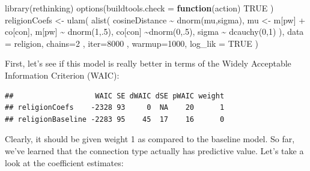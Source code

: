 \documentclass[
  12pt,
]{book}
\newenvironment{Shaded}{\begin{snugshade}}{\end{snugshade}}
\newcommand{\AttributeTok}[1]{\textcolor[rgb]{0.77,0.63,0.00}{#1}}
\newcommand{\ConstantTok}[1]{\textcolor[rgb]{0.00,0.00,0.00}{#1}}
\newcommand{\ControlFlowTok}[1]{\textcolor[rgb]{0.13,0.29,0.53}{\textbf{#1}}}
\newcommand{\DecValTok}[1]{\textcolor[rgb]{0.00,0.00,0.81}{#1}}
\newcommand{\FunctionTok}[1]{\textcolor[rgb]{0.00,0.00,0.00}{#1}}
\newcommand{\NormalTok}[1]{#1}
\newcommand{\OtherTok}[1]{\textcolor[rgb]{0.56,0.35,0.01}{#1}}
\newcommand{\SpecialCharTok}[1]{\textcolor[rgb]{0.00,0.00,0.00}{#1}}
\begin{document}
\vspace{1mm}
\footnotesize

\begin{Shaded}
\begin{Highlighting}[]
\FunctionTok{library}\NormalTok{(rethinking)}
\FunctionTok{options}\NormalTok{(}\AttributeTok{buildtools.check =} \ControlFlowTok{function}\NormalTok{(action) }\ConstantTok{TRUE}\NormalTok{ )}
\NormalTok{religionCoefs }\OtherTok{\textless{}{-}} \FunctionTok{ulam}\NormalTok{(}
  \FunctionTok{alist}\NormalTok{(}
\NormalTok{    cosineDistance }\SpecialCharTok{\textasciitilde{}} \FunctionTok{dnorm}\NormalTok{(mu,sigma),}
\NormalTok{    mu }\OtherTok{\textless{}{-}}\NormalTok{ m[pw] }\SpecialCharTok{+}\NormalTok{ co[con],}
\NormalTok{    m[pw] }\SpecialCharTok{\textasciitilde{}} \FunctionTok{dnorm}\NormalTok{(}\DecValTok{1}\NormalTok{,.}\DecValTok{5}\NormalTok{),}
\NormalTok{    co[con] }\SpecialCharTok{\textasciitilde{}}\FunctionTok{dnorm}\NormalTok{(}\DecValTok{0}\NormalTok{,.}\DecValTok{5}\NormalTok{),}
\NormalTok{    sigma }\SpecialCharTok{\textasciitilde{}} \FunctionTok{dcauchy}\NormalTok{(}\DecValTok{0}\NormalTok{,}\DecValTok{1}\NormalTok{)}
\NormalTok{  ),}
  \AttributeTok{data =}\NormalTok{ religion,}
  \AttributeTok{chains=}\DecValTok{2}\NormalTok{ , }\AttributeTok{iter=}\DecValTok{8000}\NormalTok{ , }\AttributeTok{warmup=}\DecValTok{1000}\NormalTok{, }
  \AttributeTok{log\_lik =} \ConstantTok{TRUE}
\NormalTok{)}
\end{Highlighting}
\end{Shaded}

\normalsize

\noindent First, let's see if this model is really better in terms of the Widely Acceptable Information Criterion (WAIC):

\vspace{1mm}
\footnotesize

\begin{verbatim}
##                   WAIC SE dWAIC dSE pWAIC weight
## religionCoefs    -2328 93     0  NA    20      1
## religionBaseline -2283 95    45  17    16      0
\end{verbatim}

\normalsize

Clearly, it should be given weight 1 as compared to the baseline model. So far, we've learned that the connection type actually has predictive value. Let's take a look at the coefficient estimates:

\vspace{1mm}
\footnotesize
\end{document}

